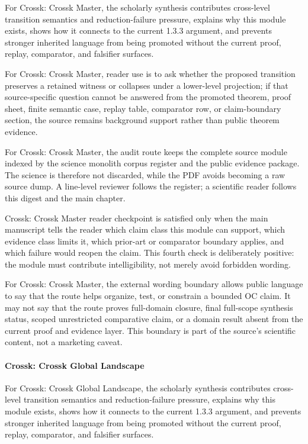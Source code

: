 For Crossk: Crossk Master, the scholarly synthesis contributes cross-level transition semantics and reduction-failure pressure, explains why this module exists, shows how it connects to the current 1.3.3 argument, and prevents stronger inherited language from being promoted without the current proof, replay, comparator, and falsifier surfaces.


For Crossk: Crossk Master, reader use is to ask whether the proposed transition preserves a retained witness or collapses under a lower-level projection; if that source-specific question cannot be answered from the promoted theorem, proof sheet, finite semantic case, replay table, comparator row, or claim-boundary section, the source remains background support rather than public theorem evidence.


For Crossk: Crossk Master, the audit route keeps the complete source module indexed by the science monolith corpus register and the public evidence package. The science is therefore not discarded, while the PDF avoids becoming a raw source dump. A line-level reviewer follows the register; a scientific reader follows this digest and the main chapter.


Crossk: Crossk Master reader checkpoint is satisfied only when the main manuscript tells the reader which claim class this module can support, which evidence class limits it, which prior-art or comparator boundary applies, and which failure would reopen the claim. This fourth check is deliberately positive: the module must contribute intelligibility, not merely avoid forbidden wording.


For Crossk: Crossk Master, the external wording boundary allows public language to say that the route helps organize, test, or constrain a bounded OC claim. It may not say that the route proves full-domain closure, final full-scope synthesis status, scoped unrestricted comparative claim, or a domain result absent from the current proof and evidence layer. This boundary is part of the source's scientific content, not a marketing caveat.


\paragraph{Crossk: Crossk Global Landscape}

For Crossk: Crossk Global Landscape, the scholarly synthesis contributes cross-level transition semantics and reduction-failure pressure, explains why this module exists, shows how it connects to the current 1.3.3 argument, and prevents stronger inherited language from being promoted without the current proof, replay, comparator, and falsifier surfaces.


